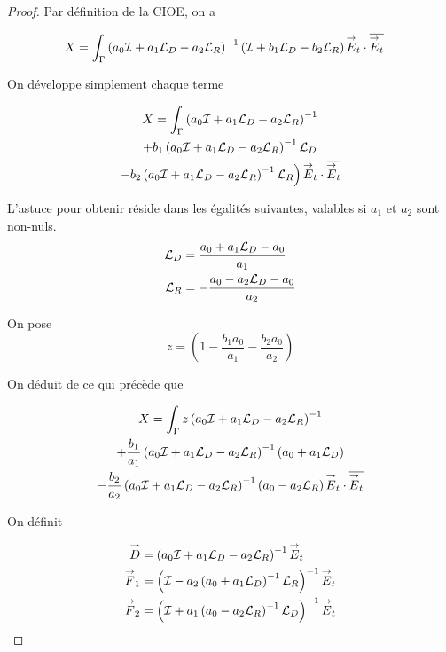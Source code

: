   \begin{proof}
    Par définition de la CIOE, on a

    \begin{align}
      X &= \int_\Gamma \left(a_0{\mathcal{I}} + a_1 {\mathcal{L}_D} - a_2 {\mathcal{L}_R} \right)^{-1}\left({\mathcal{I}} + b_1 {\mathcal{L}_D} - b_2 {\mathcal{L}_R} \right) {\overset{\rightarrow}{E}}_t\cdot {\overline{{\overset{\rightarrow}{E}}_t}}
    \end{align}

    On développe simplement chaque terme

    \begin{multline}
      X = \int_\Gamma \left(a_0{\mathcal{I}} + a_1 {\mathcal{L}_D} - a_2 {\mathcal{L}_R} \right)^{-1}
      \\
      + b_1 \left(a_0{\mathcal{I}} + a_1 {\mathcal{L}_D} - a_2 {\mathcal{L}_R} \right)^{-1}{\mathcal{L}_D}
      \\
      \left.
      - b_2 \left(a_0{\mathcal{I}} + a_1 {\mathcal{L}_D} - a_2 {\mathcal{L}_R} \right)^{-1}{\mathcal{L}_R} \right) {\overset{\rightarrow}{E}}_t\cdot {\overline{{\overset{\rightarrow}{E}}_t}}
    \end{multline}

    L'astuce pour obtenir réside dans les égalités suivantes, valables si \(a_1\) et \(a_2\) sont non-nuls.
    \begin{align}
      {\mathcal{L}_D} & = \dfrac{a_0 + a_1 {\mathcal{L}_D} - a_0}{a_1}
      \\
      {\mathcal{L}_R} & = -\dfrac{a_0 - a_2 {\mathcal{L}_D} - a_0}{a_2}
    \end{align}

    On pose
    \begin{equation}
      z = \left(1 - \frac{b_1a_0}{a_1} - \frac{b_2a_0}{a_2}\right)
    \end{equation}

    On déduit de ce qui précède que

    \begin{multline}
      X = \int_\Gamma z\left(a_0{\mathcal{I}} + a_1 {\mathcal{L}_D} - a_2 {\mathcal{L}_R} \right)^{-1}
      \\
      + \dfrac{b_1}{a_1} \left(a_0{\mathcal{I}} + a_1 {\mathcal{L}_D} - a_2 {\mathcal{L}_R} \right)^{-1}\left(a_0+a_1{\mathcal{L}_D}\right)
      \\
      - \dfrac{b_2}{a_2} \left(a_0{\mathcal{I}} + a_1 {\mathcal{L}_D} - a_2 {\mathcal{L}_R} \right)^{-1}\left(a_0-a_2{\mathcal{L}_R}\right) {\overset{\rightarrow}{E}}_t\cdot {\overline{{\overset{\rightarrow}{E}}_t}}
    \end{multline}

    On définit

    \newcommand{\vD}{\vect{D}}
    \newcommand{\vF}{\vect{F}}

    \begin{align}
      \vD & = \left(a_0 \oI + a_1 \LD - a_2\LR \right)^{-1} \vE_t
      \\
      \vF_1 & = \left(\oI - a_2 \left( a_0 + a_1\LD\right)^{-1}\LR\right)^{-1} \vE_t
      \\
      \vF_2 & = \left(\oI + a_1 \left( a_0 - a_2\LR\right)^{-1}\LD\right)^{-1} \vE_t
    \end{align}


\end{proof}

